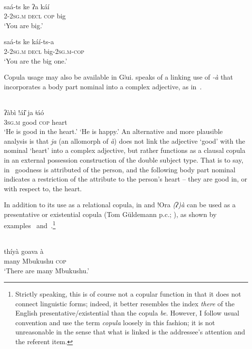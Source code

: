 \documentclass[output=paper]{LSP/langsci}
\begin{document}
\ea {}\\
\ea\label{09-mc-ex:6}
\gll saá-ts ke ʔa káí \\
2-2\textsc{sg.m} \textsc{decl} \textsc{cop} big\\
\glt ‘You are big.’ 

\ex\label{09-mc-ex:7}
\gll saá-ts ke káí-ts-a \\
2-2\textsc{sg.m} \textsc{decl} big-2\textsc{sg.m}-\textsc{cop}\\
\glt ‘You are the big one.’ 
\z
\z

Copula usage may also be available in Gǀui. \citet[400]{Nakagawa2013Gana} speaks of a linking use of \textit{-à} that incorporates a body part nominal into a complex adjective, as in~.

\ea {}\\ \label{09-mc-ex:8}
\gll ʔàbì !ái͂ ja ǂáó\\
3\textsc{sg.m} good \textsc{cop} heart\\
\glt ‘He is good in the heart.’ \ie ‘He is happy.’
\z
An alternative and more plausible analysis is that \textit{ja} (an allomorph of \textit{à}) does not link the adjective ‘good’ with the nominal ‘heart’ into a complex adjective, but rather functions as a clausal copula in an external possession construction of the double subject type. That is to say, in~ goodness is attributed of the person, and the following body part nominal indicates a restriction of the attribute to the person’s heart – they are good in, or with respect to, the heart.

In addition to its use as a relational copula, in  and !Ora \textit{(ʔ)à} can be used as a presentative or existential copula (Tom Güldemann p.c.; \citealt[52]{Kilian-Hatz2008Grammar}), as shown by examples~ and~.\footnote{Strictly speaking, this is of course not a copular function in that it does not connect linguistic forms; indeed, it better resembles the index \textit{there} of the English presentative/existential than the copula \textit{be}. However, I follow usual convention and use the term \textit{copula} loosely in this fashion; it is not unreasonable in the sense that what is linked is the addressee’s attention and the referent item.}

\ea {}\\
\ea\label{09-mc-ex:9}  
\gll thíyà goava à \\
many Mbukushu \textsc{cop}\\
\glt ‘There are many Mbukushu.’
 
\end{document}

